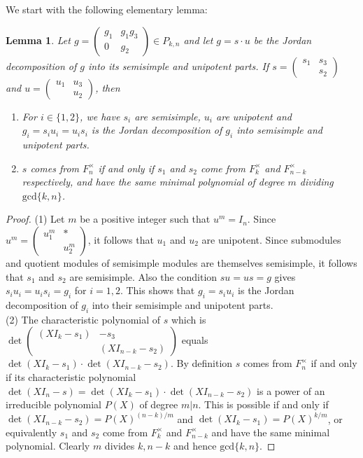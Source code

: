\documentclass[reqno]{amsart}
\newtheorem{lemma}[theorem]{Lemma}
\theoremstyle{definition}
\theoremstyle{remark}
\numberwithin{equation}{section}
\newcommand{\bbsm}{\left (\begin{smallmatrix}}      \newcommand{\besm}{\end{smallmatrix}\right )}
\begin{document}
We start with the following  elementary lemma:
\begin{lemma} \label{jordan_chevalley_for_P_k_n}
    Let $g=\bbsm g_1 & g_1 g_3\\0& g_2 \besm \in P_{k,n}$ and let $g=s \cdot u$ be the Jordan decomposition of $g$ into its semisimple and unipotent parts. If $s = \bbsm s_1 & s_3\\&s_2 \besm$ and $u = \bbsm u_1 & u_3\\&u_2 \besm$, then
    \begin{enumerate}
        \item[\emph{(1)}]
    For $i \in\{1,2\}$, we have $s_i$  are semisimple, $u_i$ are unipotent and $g_i=s_i u_i=u_i s_i$ is   the Jordan decomposition of $g_i$ into semisimple and unipotent parts.\\

    \item[\emph{(2)}] $s$ comes from $F_n^\times$ if and only if $s_1$ and $s_2$ come from $F_k^\times$ and  $F_{n-k}^\times$ respectively, and have the same minimal polynomial of degree $m$ dividing $\text{gcd}\{k,n\}$.
    \end{enumerate}
\end{lemma}
\begin{proof}
   (1)  Let $m$ be a positive integer such that $u^m = I_n$. Since  $u^m= \bbsm u_1^m & \ast\\ & u_2^m \besm$, it follows that $u_1$ and $u_2$ are unipotent. Since submodules and quotient modules of semisimple modules are themselves semisimple, it follows that  $s_1$  and $s_2$ are semisimple.
    Also the condition $s u=u s = g$ gives $s_i u_i=u_i s_i = g_i$ for $i=1,2$.   This shows that $g_i = s_iu_i$ is the Jordan decomposition of $g_i$ into their semisimple and unipotent parts.\\


    (2) The characteristic polynomial of $s$ which is $\det\bbsm (X I_k-s_1) & -s_3 \\ & (X I_{n-k} -s_2) \besm$ equals $\det(X I_k-s_1) \cdot \det(X I_{n-k}-s_2)$. By definition $s$ comes  from $F_n^\times$ if and only if  its characteristic polynomial $\det(X I_n-s)= 
      \det(X I_k-s_1) \cdot \det(X I_{n-k}-s_2)$ is a   power of an irreducible polynomial $P(X)$ of degree $m|n$. This is possible if and only if $\det(X I_{n-k}-s_2) = P(X)^{(n-k)/m}$ and $\det(X I_{k}-s_1) = P(X)^{k/m}$, or equivalently $s_1$ and $s_2$ come from $F_k^\times$ and $F_{n-k}^\times$ and have the same minimal polynomial. Clearly $m$ divides $k, n-k$ and hence $\text{gcd}\{k,n\}$.
     \end{proof}
    
\end{document}
